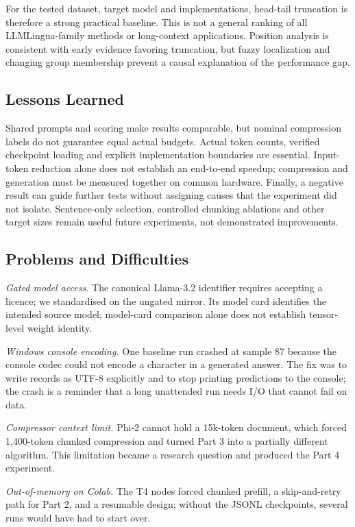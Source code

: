 \documentclass[10pt,a4paper,twocolumn]{article}
\begin{document}
For the tested dataset, target model and implementations, head-tail truncation is
therefore a strong practical baseline. This is not a general ranking of all
LLMLingua-family methods or long-context applications. Position analysis is
consistent with early evidence favoring truncation, but fuzzy localization and
changing group membership prevent a causal explanation of the performance gap.

\subsection{Lessons Learned}

Shared prompts and scoring make results comparable, but nominal compression
labels do not guarantee equal actual budgets. Actual token counts, verified
checkpoint loading and explicit implementation boundaries are essential.
Input-token reduction alone does not establish an end-to-end speedup; compression
and generation must be measured together on common hardware. Finally, a negative
result can guide further tests without assigning causes that the experiment did
not isolate. Sentence-only selection, controlled chunking ablations and other
target sizes remain useful future experiments, not demonstrated improvements.

\subsection{Problems and Difficulties}

\emph{Gated model access.} The canonical Llama-3.2 identifier requires accepting a
licence; we standardised on the ungated mirror. Its model card identifies the intended source model; model-card comparison alone does not establish tensor-level weight identity.

\emph{Windows console encoding.} One baseline run crashed at sample 87 because the
console codec could not encode a character in a generated answer. The fix was to
write records as UTF-8 explicitly and to stop printing predictions to the console;
the crash is a reminder that a long unattended run needs I/O that cannot fail on
data.

\emph{Compressor context limit.} Phi-2 cannot hold a 15k-token document, which
forced 1{,}400-token chunked compression and turned Part 3 into a partially
different algorithm. This limitation became a research question and produced the
Part 4 experiment.

\emph{Out-of-memory on Colab.} The T4 nodes forced chunked prefill, a skip-and-retry path for Part 2, and a resumable design; without the JSONL checkpoints, several runs
would have had to start over.
\end{document}
